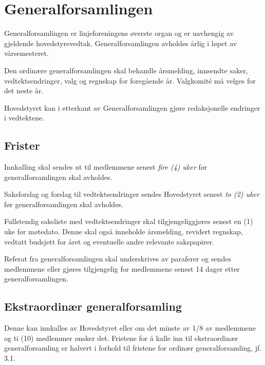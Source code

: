 \chapter{Generalforsamlingen}

Generalforsamlingen er linjeforeningens øverste organ og er uavhengig av gjeldende hovedstyrevedtak. Generalforsamlingen avholdes årlig i løpet av vårsemesteret.\newline

Den ordinære generalforsamlingen skal behandle årsmelding, innsendte saker, vedtektsendringer, valg og regnskap for foregående år. Valgkomité må velges for det neste år.

Hovedstyret kan i etterkant av Generalforsamlingen gjøre redaksjonelle endringer i vedtektene.  

\section{Frister}
\label{sec:frister}
\begin{liste}
	\item Innkalling skal sendes ut til medlemmene senest \emph{fire (4) uker}  før \mbox{generalforsamlingen} skal avholdes.
	\item Saksforslag og forslag til vedtektsendringer sendes Hovedstyret senest \emph{to (2) uker} før generalforsamlingen skal avholdes.
	\item Fullstendig saksliste med vedtektsendringer skal tilgjengeliggjøres senest en (1) uke før møtedato. Denne skal også inneholde årsmelding, revidert regnskap, vedtatt budsjett for året og eventuelle andre relevante sakspapirer.
	\item Referat fra generalforsamlingen skal underskrives av paraferer og sendes \linebreak medlemmene eller gjøres tilgjengelig for medlemmene senest 14 dager etter generalforsamlingen.
\end{liste}


\section{Ekstraordinær generalforsamling}
\vspace{23pt}
Denne kan innkalles av Hovedstyret eller om det minste av 1/8 av medlemmene og ti (10) medlemmer ønsker det. Fristene for å kalle inn til ekstraordinær generalforsamling er halvert i forhold til fristene for ordinær generalforsamling, jf. 3.1.\newline

